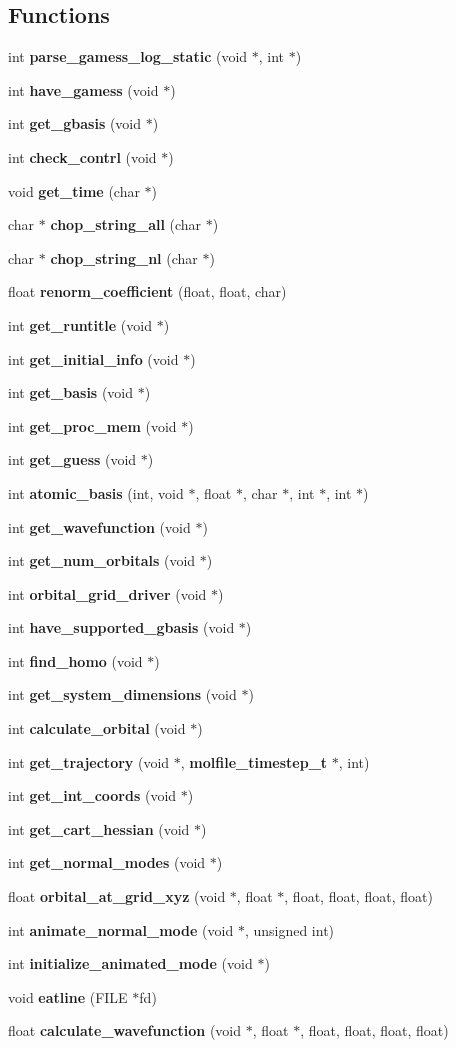 \subsection*{Functions}
\begin{CompactItemize}
\item 
int {\bf parse\_\-gamess\_\-log\_\-static} (void $\ast$, int $\ast$)
\item 
int {\bf have\_\-gamess} (void $\ast$)
\item 
int {\bf get\_\-gbasis} (void $\ast$)
\item 
int {\bf check\_\-contrl} (void $\ast$)
\item 
void {\bf get\_\-time} (char $\ast$)
\item 
char $\ast$ {\bf chop\_\-string\_\-all} (char $\ast$)
\item 
char $\ast$ {\bf chop\_\-string\_\-nl} (char $\ast$)
\item 
float {\bf renorm\_\-coefficient} (float, float, char)
\item 
int {\bf get\_\-runtitle} (void $\ast$)
\item 
int {\bf get\_\-initial\_\-info} (void $\ast$)
\item 
int {\bf get\_\-basis} (void $\ast$)
\item 
int {\bf get\_\-proc\_\-mem} (void $\ast$)
\item 
int {\bf get\_\-guess} (void $\ast$)
\item 
int {\bf atomic\_\-basis} (int, void $\ast$, float $\ast$, char $\ast$, int $\ast$, int $\ast$)
\item 
int {\bf get\_\-wavefunction} (void $\ast$)
\item 
int {\bf get\_\-num\_\-orbitals} (void $\ast$)
\item 
int {\bf orbital\_\-grid\_\-driver} (void $\ast$)
\item 
int {\bf have\_\-supported\_\-gbasis} (void $\ast$)
\item 
int {\bf find\_\-homo} (void $\ast$)
\item 
int {\bf get\_\-system\_\-dimensions} (void $\ast$)
\item 
int {\bf calculate\_\-orbital} (void $\ast$)
\item 
int {\bf get\_\-trajectory} (void $\ast$, {\bf molfile\_\-timestep\_\-t} $\ast$, int)
\item 
int {\bf get\_\-int\_\-coords} (void $\ast$)
\item 
int {\bf get\_\-cart\_\-hessian} (void $\ast$)
\item 
int {\bf get\_\-normal\_\-modes} (void $\ast$)
\item 
float {\bf orbital\_\-at\_\-grid\_\-xyz} (void $\ast$, float $\ast$, float, float, float, float)
\item 
int {\bf animate\_\-normal\_\-mode} (void $\ast$, unsigned int)
\item 
int {\bf initialize\_\-animated\_\-mode} (void $\ast$)
\item 
void {\bf eatline} (FILE $\ast$fd)
\item 
float {\bf calculate\_\-wavefunction} (void $\ast$, float $\ast$, float, float, float, float)
\end{CompactItemize}


